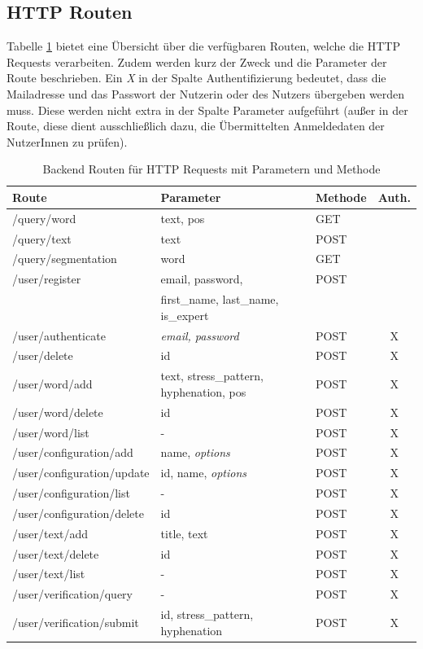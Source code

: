 \subsection{HTTP Routen}
Tabelle \ref{table:backendroutes} bietet eine Übersicht über die verfügbaren Routen, welche die HTTP Requests verarbeiten. Zudem werden kurz der Zweck und die Parameter der Route beschrieben. Ein \textit{X} in der Spalte Authentifizierung bedeutet, dass die Mailadresse und das Passwort der Nutzerin oder des Nutzers übergeben werden muss. Diese werden nicht extra in der Spalte Parameter aufgeführt (außer in der  Route, diese dient ausschließlich dazu, die Übermittelten Anmeldedaten der NutzerInnen zu prüfen).

\begin{table}[h!]
	\centering
	\begin{tabular}{|l|l|l|c|}
		\hline
		\textbf{Route} & \textbf{Parameter} & \textbf{Methode} & \textbf{Auth.}\\
		\hline
		\hline
		/query/word & text, pos & GET & \\
		\hline
		/query/text & text & POST & \\
		\hline
		/query/segmentation& word & GET & \\
		\hline
		\hline
		/user/register & email, password, & POST & \\
		& first\_name, last\_name, is\_expert &&\\
		\hline
		/user/authenticate & \textit{email, password} & POST & X\\
		\hline
		/user/delete & id & POST & X\\
		\hline
		\hline
		/user/word/add& text, stress\_pattern, hyphenation, pos & POST & X\\
		\hline
		/user/word/delete& id & POST & X\\
		\hline
		/user/word/list & - & POST & X\\
		\hline
		\hline
		/user/configuration/add & name, \textit{options} & POST & X\\
		\hline
		/user/configuration/update & id, name, \textit{options}  & POST & X\\
		\hline
		/user/configuration/list & - & POST & X\\
		\hline
		/user/configuration/delete & id & POST & X\\
		\hline
		\hline
		/user/text/add & title, text & POST & X\\
		\hline
		/user/text/delete & id & POST & X\\
		\hline
		/user/text/list & - & POST & X\\
		\hline
		\hline
		/user/verification/query & - & POST & X\\
		\hline
		/user/verification/submit & id, stress\_pattern, hyphenation & POST & X\\
		\hline
	\end{tabular}
	\caption{Backend Routen für HTTP Requests mit Parametern und Methode}
	\label{table:backendroutes}
\end{table}

